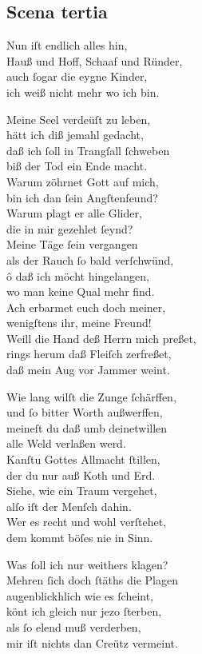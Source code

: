 \documentclass{ees}
\newenvironment{lyrics}[1]{%
  \subsection{#1}\nopagebreak%
  \begin{lyricslist}%
  \let\voice\item%
}{%
  \end{lyricslist}%
}
\begin{document}
\begin{lyrics}{Scena tertia}
  \voice[Jobs Frau]
  Nun iſt endlich alles hin,\\
  Hauß und Hoff, Schaaf und Ründer,\\
  auch ſogar die eygne Kinder,\\
  ich weiß nicht mehr wo ich bin.

  \voice[Job]
  Meine Seel verdeüſt zu leben,\\
  hätt ich diß jemahl gedacht,\\
  daß ich ſoll in Trangſall ſchweben\\
  biß der Tod ein Ende macht.\\
  Warum zöhrnet Gott auf mich,\\
  bin ich dan ſein Angſtenfeund?\\
  Warum plagt er alle Glider,\\
  die in mir gezehlet ſeynd?\\
  Meine Täge ſein vergangen\\
  als der Rauch ſo bald verſchwünd,\\
  ô daß ich möcht hingelangen,\\
  wo man keine Qual mehr find.\\
  Ach erbarmet euch doch meiner,\\
  wenigſtens ihr, meine Freund!\\
  Weill die Hand deß Herrn mich preßet,\\
  rings herum daß Fleiſch zerfreßet,\\
  daß mein Aug vor Jammer weint.

  \voice[Eliphas]
  Wie lang wilſt die Zunge ſchärffen,\\
  und ſo bitter Worth außwerffen,\\
  meineſt du daß umb deinetwillen\\
  alle Weld verlaßen werd.\\
  Kanſtu Gottes Allmacht ſtillen,\\
  der du nur auß Koth und Erd.\\
  Siehe, wie ein Traum vergehet,\\
  alſo iſt der Menſch dahin.\\
  Wer es recht und wohl verſtehet,\\
  dem kommt böſes nie in Sinn.

  \voice[Jobs Frau]
  Was ſoll ich nur weithers klagen?\\
  Mehren ſich doch ſtäths die Plagen\\
  augenblickhlich wie es ſcheint,\\
  könt ich gleich nur jezo ſterben,\\
  als ſo elend muß verderben,\\
  mir iſt nichts dan Creütz vermeint.
\end{lyrics}
\end{document}
